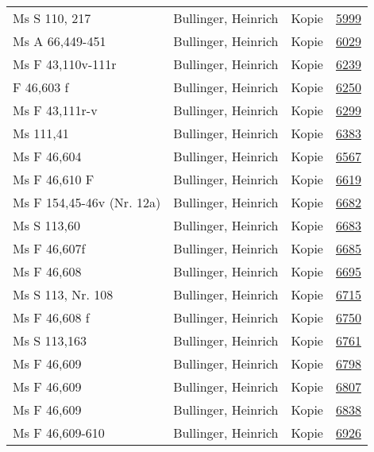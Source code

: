 \documentclass[10pt,a4paper,landscape]{report}
\begin{document}
\begin{longtable}{p{16cm}p{4cm}lr}
Ms S 110, 217	&	Bullinger, Heinrich	&	Kopie	&	\href{http://130.60.24.72/assignment/5999}{5999}\\
Ms A 66,449-451	&	Bullinger, Heinrich	&	Kopie	&	\href{http://130.60.24.72/assignment/6029}{6029}\\
Ms F 43,110v-111r	&	Bullinger, Heinrich	&	Kopie	&	\href{http://130.60.24.72/assignment/6239}{6239}\\
F 46,603 f	&	Bullinger, Heinrich	&	Kopie	&	\href{http://130.60.24.72/assignment/6250}{6250}\\
Ms F 43,111r-v	&	Bullinger, Heinrich	&	Kopie	&	\href{http://130.60.24.72/assignment/6299}{6299}\\
Ms 111,41	&	Bullinger, Heinrich	&	Kopie	&	\href{http://130.60.24.72/assignment/6383}{6383}\\
Ms F 46,604	&	Bullinger, Heinrich	&	Kopie	&	\href{http://130.60.24.72/assignment/6567}{6567}\\
Ms F 46,610 F	&	Bullinger, Heinrich	&	Kopie	&	\href{http://130.60.24.72/assignment/6619}{6619}\\
Ms F 154,45-46v (Nr. 12a)	&	Bullinger, Heinrich	&	Kopie	&	\href{http://130.60.24.72/assignment/6682}{6682}\\
Ms S 113,60	&	Bullinger, Heinrich	&	Kopie	&	\href{http://130.60.24.72/assignment/6683}{6683}\\
Ms F 46,607f	&	Bullinger, Heinrich	&	Kopie	&	\href{http://130.60.24.72/assignment/6685}{6685}\\
Ms F 46,608	&	Bullinger, Heinrich	&	Kopie	&	\href{http://130.60.24.72/assignment/6695}{6695}\\
Ms S 113, Nr. 108	&	Bullinger, Heinrich	&	Kopie	&	\href{http://130.60.24.72/assignment/6715}{6715}\\
Ms F 46,608 f	&	Bullinger, Heinrich	&	Kopie	&	\href{http://130.60.24.72/assignment/6750}{6750}\\
Ms S 113,163	&	Bullinger, Heinrich	&	Kopie	&	\href{http://130.60.24.72/assignment/6761}{6761}\\
Ms F 46,609	&	Bullinger, Heinrich	&	Kopie	&	\href{http://130.60.24.72/assignment/6798}{6798}\\
Ms F 46,609	&	Bullinger, Heinrich	&	Kopie	&	\href{http://130.60.24.72/assignment/6807}{6807}\\
Ms F 46,609	&	Bullinger, Heinrich	&	Kopie	&	\href{http://130.60.24.72/assignment/6838}{6838}\\
Ms F 46,609-610	&	Bullinger, Heinrich	&	Kopie	&	\href{http://130.60.24.72/assignment/6926}{6926}\\

\end{longtable}
\end{document}
